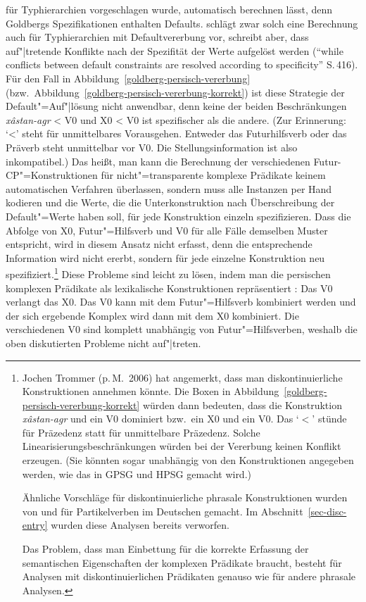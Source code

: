 für Typhierarchien vorgeschlagen wurde, automatisch berechnen lässt, denn Goldbergs Spezifikationen
enthalten Defaults. \citet{Malouf2003a} schlägt zwar solch eine Berechnung auch für Typhierarchien
mit Defaultvererbung vor, schreibt aber, dass auf"|tretende Konflikte nach der Spezifität der 
Werte aufgelöst werden ("`while conflicts between default constraints are resolved according
to specificity"' S.\,416). Für den Fall in Abbildung~\ref{goldberg-persisch-vererbung} (bzw.\
Abbildung~\ref{goldberg-persisch-vererbung-korrekt}) ist diese Strategie der Default"=Auf"|lösung
nicht anwendbar, denn keine der beiden Beschränkungen \emph{x{\^a}stan-agr}  <  V0\sub{past}
und X0 < V0 ist spezifischer als die andere. (Zur Erinnerung: `<' steht für unmittelbares
Vorausgehen. Entweder das Futurhilfsverb oder das Präverb steht unmittelbar vor V0. Die Stellungsinformation
ist also inkompatibel.) Das heißt, man kann die Berechnung der verschiedenen
Futur-CP"=Konstruktionen für nicht"=transparente komplexe Prädikate keinem automatischen Verfahren überlassen,
sondern muss alle Instanzen per Hand kodieren und die Werte, die die Unterkonstruktion nach Überschreibung
der Default"=Werte haben soll, für jede Konstruktion einzeln spezifizieren. Dass die Abfolge
von X0, Futur"=Hilfsverb und V0 für alle Fälle demselben Muster entspricht, wird in diesem
Ansatz nicht erfasst, denn die entsprechende Information wird nicht ererbt, sondern für jede
einzelne Konstruktion neu spezifiziert.\footnote{
  Jochen Trommer (p.\,M.\ 2006) hat angemerkt, dass man diskontinuierliche
  Konstruktionen annehmen könnte. Die Boxen in Abbildung~\ref{goldberg-persisch-vererbung-korrekt}
  würden dann bedeuten, dass die Konstruktion \emph{x{\^a}stan-agr} und ein V0 dominiert bzw.\ ein X0
  und ein V0. Das `$<$' stünde\is{Linearisierung!-sdomäne}\is{Linearisierung!-sregel} für Präzedenz
  statt für unmittelbare Präzedenz. Solche Linearisierungsbeschränkungen 
  würden bei der Vererbung keinen Konflikt erzeugen. (Sie könnten sogar unabhängig von den
  Konstruktionen angegeben werden, wie das in GPSG und HPSG gemacht wird.)

  Ähnliche Vorschläge für diskontinuierliche phrasale Konstruktionen wurden von \citet*[\page
  244--248]{Kathol95a} und \citet[Abschnitt~4.2]{Crysmann2002a} für Partikelverben im Deutschen gemacht.
  Im Abschnitt~\ref{sec-disc-entry} wurden diese Analysen bereits verworfen.

  Das Problem, dass man Einbettung für die korrekte Erfassung der semantischen Eigenschaften der
  komplexen Prädikate braucht, besteht für Analysen mit diskontinuierlichen Prädikaten genauso wie
  für andere phrasale Analysen.
}
Diese Probleme sind leicht zu lösen, indem man die persischen komplexen Prädikate als lexikalische
Konstruktionen repräsentiert \citep{MuellerPersian}: Das V0 verlangt das X0. Das V0 kann mit dem Futur"=Hilfsverb
kombiniert werden und der sich ergebende Komplex wird dann mit dem X0 kombiniert. Die
verschiedenen V0 sind komplett unabhängig von Futur"=Hilfsverben, weshalb die oben diskutierten
Probleme nicht auf"|treten.

